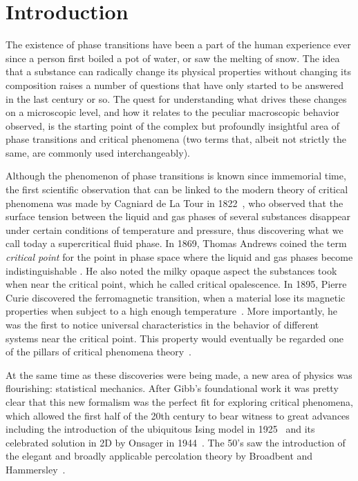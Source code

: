 \chapter{Introduction}
\label{ch:intr}

The existence of phase transitions have been a part of the human experience ever
since a person first boiled a pot of water, or saw the melting of snow. The
idea that a substance can radically change its physical properties without
changing its composition raises a number of questions that have only started to
be answered in the last century or so. The quest for understanding what
drives these changes on a microscopic level, and how it relates to the
peculiar macroscopic behavior observed, is the starting point of the complex
but profoundly insightful area of phase transitions and critical phenomena (two
terms that, albeit not strictly the same, are commonly used interchangeably).

Although the phenomenon of phase transitions is known since immemorial time,
the first scientific observation that can be linked to the modern theory of
critical phenomena was made by Cagniard de La Tour in 1822~\cite{delaTour1822},
who observed that the surface tension between the liquid and gas phases of
several substances disappear under certain conditions of temperature and
pressure, thus discovering what we call today a supercritical fluid phase. In
1869, Thomas Andrews coined the term \textit{critical point} for the point in
phase space where the liquid and gas phases become indistinguishable
\cite{Andrews1869}. He also noted the milky opaque aspect the substances took
when near the critical point, which he called critical opalescence. In 1895,
Pierre Curie discovered the ferromagnetic transition, when a material lose its
magnetic properties when subject to a high enough temperature~\cite{Curie1895}.
More importantly, he was the first to notice universal characteristics in the
behavior of different systems near the critical point. This property would
eventually be regarded one of the pillars of critical phenomena
theory~\cite{Stanley1999}.

At the same time as these discoveries were being made, a new area of physics
was flourishing: statistical mechanics. After Gibb's foundational work
\cite{Gibbs1906} it was pretty clear that this new formalism was the perfect
fit for exploring critical phenomena, which allowed the first half of the 20th
century to bear witness to great advances including the introduction of the
ubiquitous Ising model in 1925~\cite{Ising1925} and its celebrated solution in
2D by Onsager in 1944~\cite{Onsager1944}. The 50's saw the introduction of the
elegant and broadly applicable percolation theory by Broadbent and
Hammersley~\cite{Broadbent1957}.

